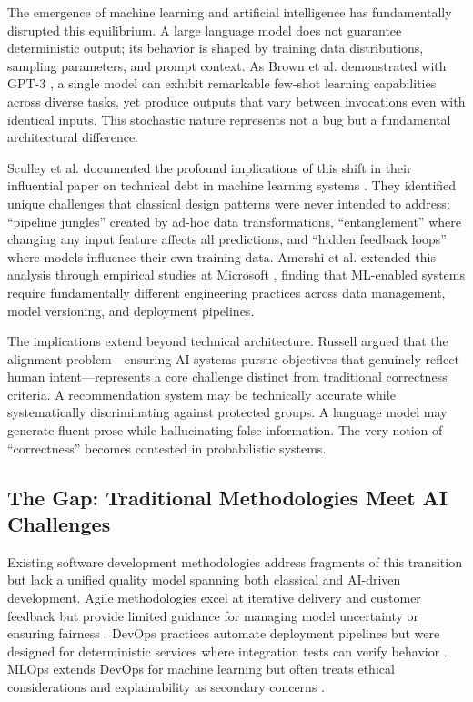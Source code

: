 \documentclass[11pt,a4paper]{article}
\begin{document}
The emergence of machine learning and artificial intelligence has fundamentally disrupted this equilibrium. A large language model does not guarantee deterministic output; its behavior is shaped by training data distributions, sampling parameters, and prompt context. As Brown et al. demonstrated with GPT-3 \cite{brown2020language}, a single model can exhibit remarkable few-shot learning capabilities across diverse tasks, yet produce outputs that vary between invocations even with identical inputs. This stochastic nature represents not a bug but a fundamental architectural difference.

Sculley et al. documented the profound implications of this shift in their influential paper on technical debt in machine learning systems \cite{sculley2015hidden}. They identified unique challenges that classical design patterns were never intended to address: ``pipeline jungles'' created by ad-hoc data transformations, ``entanglement'' where changing any input feature affects all predictions, and ``hidden feedback loops'' where models influence their own training data. Amershi et al. extended this analysis through empirical studies at Microsoft \cite{amershi2019software}, finding that ML-enabled systems require fundamentally different engineering practices across data management, model versioning, and deployment pipelines.

The implications extend beyond technical architecture. Russell \cite{russell2019human} argued that the alignment problem---ensuring AI systems pursue objectives that genuinely reflect human intent---represents a core challenge distinct from traditional correctness criteria. A recommendation system may be technically accurate while systematically discriminating against protected groups. A language model may generate fluent prose while hallucinating false information. The very notion of ``correctness'' becomes contested in probabilistic systems.

\subsection{The Gap: Traditional Methodologies Meet AI Challenges}

Existing software development methodologies address fragments of this transition but lack a unified quality model spanning both classical and AI-driven development. Agile methodologies excel at iterative delivery and customer feedback but provide limited guidance for managing model uncertainty or ensuring fairness \cite{beck2000extreme}. DevOps practices automate deployment pipelines but were designed for deterministic services where integration tests can verify behavior \cite{humble2010continuous}. MLOps extends DevOps for machine learning but often treats ethical considerations and explainability as secondary concerns \cite{sridhar2022mlops}.
\end{document}
